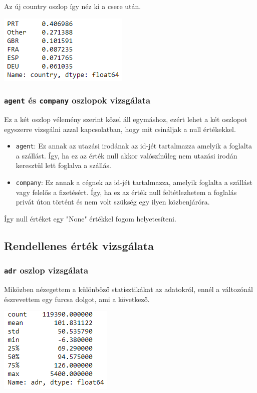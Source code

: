 Az új country oszlop  így néz ki a csere után.

\includegraphics{images/4.fejezet/2.adattisztitas2.PNG}

\subsubsection{\texttt{agent} és \texttt{company} oszlopok vizsgálata}

Ez a két oszlop vélemény szerint közel áll egymáshoz, ezért lehet a két oszlopot egyszerre vizsgálni azzal kapcsolatban, hogy mit csináljak a null értékekkel.
\begin{itemize}
    \item \texttt{agent}: Ez annak az utazási irodának az id-jét tartalmazza amelyik a foglalta a szállást. Így, ha ez az érték null akkor valószínűleg nem utazási irodán keresztül lett foglalva a szállás.
    \item \texttt{company}: Ez annak a cégnek az id-jét tartalmazza, amelyik foglalta a szállást vagy felelős a fizetésért. Így, ha ez az érték null feltétlezhetem a foglalás privát úton történt és nem volt szükség egy ilyen közbenjáróra.
\end{itemize}
Így null értéket egy "None" értékkel fogom helyetesíteni.

\subsection{Rendellenes érték vizsgálata}

\subsubsection{\texttt{adr} oszlop vizsgálata}
Miközben nézegettem a különböző statisztikákat az adatokról, ennél a változónál észrevettem egy furcsa dolgot, ami a következő.

\includegraphics{images/4.fejezet/2.adattisztitas3.PNG}

